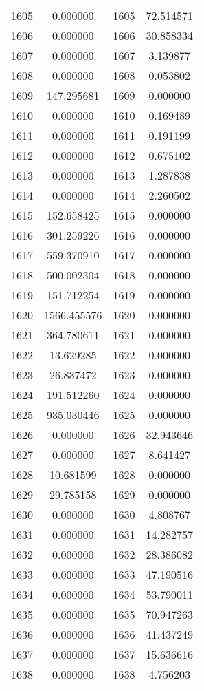 \documentclass[12pt]{article}
\begin{document}
\begin{longtable}{@{}cccc@{}}
1605 & 0.000000 & 1605 & 72.514571 \\
1606 & 0.000000 & 1606 & 30.858334 \\
1607 & 0.000000 & 1607 & 3.139877 \\
1608 & 0.000000 & 1608 & 0.053802 \\
1609 & 147.295681 & 1609 & 0.000000 \\
1610 & 0.000000 & 1610 & 0.169489 \\
1611 & 0.000000 & 1611 & 0.191199 \\
1612 & 0.000000 & 1612 & 0.675102 \\
1613 & 0.000000 & 1613 & 1.287838 \\
1614 & 0.000000 & 1614 & 2.260502 \\
1615 & 152.658425 & 1615 & 0.000000 \\
1616 & 301.259226 & 1616 & 0.000000 \\
1617 & 559.370910 & 1617 & 0.000000 \\
1618 & 500.002304 & 1618 & 0.000000 \\
1619 & 151.712254 & 1619 & 0.000000 \\
1620 & 1566.455576 & 1620 & 0.000000 \\
1621 & 364.780611 & 1621 & 0.000000 \\
1622 & 13.629285 & 1622 & 0.000000 \\
1623 & 26.837472 & 1623 & 0.000000 \\
1624 & 191.512260 & 1624 & 0.000000 \\
1625 & 935.030446 & 1625 & 0.000000 \\
1626 & 0.000000 & 1626 & 32.943646 \\
1627 & 0.000000 & 1627 & 8.641427 \\
1628 & 10.681599 & 1628 & 0.000000 \\
1629 & 29.785158 & 1629 & 0.000000 \\
1630 & 0.000000 & 1630 & 4.808767 \\
1631 & 0.000000 & 1631 & 14.282757 \\
1632 & 0.000000 & 1632 & 28.386082 \\
1633 & 0.000000 & 1633 & 47.190516 \\
1634 & 0.000000 & 1634 & 53.790011 \\
1635 & 0.000000 & 1635 & 70.947263 \\
1636 & 0.000000 & 1636 & 41.437249 \\
1637 & 0.000000 & 1637 & 15.636616 \\
1638 & 0.000000 & 1638 & 4.756203 \\

\end{longtable}
\end{document}

